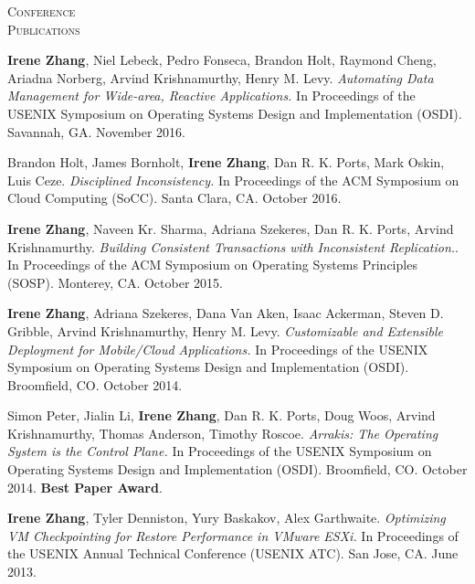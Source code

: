 \documentclass[10pt,times]{report}
\newlength{\sectiongap}
\newlength{\sectioncolwidth}
\newlength{\colgap}
\newlength{\stuffwidth}
\newenvironment{rtable}{
  \begin{minipage}{\textwidth}
  }{
  \end{minipage}
}
\newenvironment{rsection}[1]{
  \begin{minipage}[t]{\sectioncolwidth}
    \textsc{#1}
  \end{minipage}
  \hspace{\colgap}
  \begin{minipage}[t]{\stuffwidth}
  }{
    \removelastskip
  \end{minipage}
  \\[\sectiongap]
}
\begin{document}
\begin{rtable}
 \begin{rsection}{Conference\\Publications}
   \textbf{Irene Zhang}, Niel Lebeck, Pedro Fonseca, Brandon Holt,
   Raymond Cheng, Ariadna Norberg, Arvind Krishnamurthy, Henry
   M. Levy. \textit{Automating Data Management for Wide-area, Reactive
     Applications.}  In Proceedings of the USENIX Symposium on
   Operating Systems Design and Implementation (OSDI). Savannah,
   GA. November 2016.\\\vspace{-0.5em}

   Brandon Holt, James Bornholt, \textbf{Irene Zhang}, Dan
   R. K. Ports, Mark Oskin, Luis Ceze. \textit{Disciplined
     Inconsistency.}  In Proceedings of the ACM Symposium on Cloud
   Computing (SoCC). Santa Clara, CA. October 2016.\\\vspace{-0.5em}

   \textbf{Irene Zhang}, Naveen Kr. Sharma, Adriana Szekeres, Dan
   R. K. Ports, Arvind Krishnamurthy. \textit{Building Consistent
     Transactions with Inconsistent Replication.}.  In Proceedings of
   the ACM Symposium on Operating Systems Principles (SOSP). Monterey,
   CA. October 2015.\\\vspace{-0.5em}

   \textbf{Irene Zhang}, Adriana Szekeres, Dana Van Aken, Isaac
   Ackerman, Steven D. Gribble, Arvind Krishnamurthy, Henry
   M. Levy. \textit{Customizable and Extensible Deployment for
     Mobile/Cloud Applications.}  In Proceedings of the USENIX Symposium
   on Operating Systems Design and
   Implementation (OSDI). Broomfield, CO. October 2014.\\ \vspace{-0.5em}

   Simon Peter, Jialin Li, \textbf{Irene Zhang}, Dan R. K. Ports, Doug
   Woos, Arvind Krishnamurthy, Thomas Anderson, Timothy Roscoe.
   \textit{Arrakis: The Operating System is the Control Plane.}  In
   Proceedings of the USENIX Symposium on Operating Systems Design and
   Implementation (OSDI).
   Broomfield, CO. October 2014. \textbf{Best Paper
     Award}.\\\vspace{-0.5em}

   \textbf{Irene Zhang}, Tyler Denniston, Yury Baskakov, Alex
   Garthwaite.   \textit{Optimizing VM Checkpointing for Restore
     Performance in VMware ESXi.}
   In Proceedings of the USENIX Annual Technical Conference (USENIX ATC).
   San Jose, CA. June 2013.\\\vspace{-0.5em}


\end{rsection}
\end{rtable}
\end{document}
